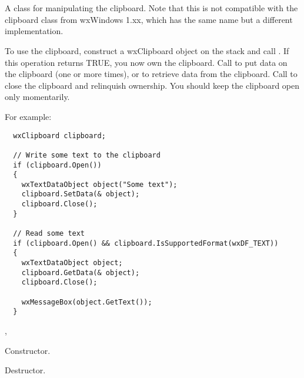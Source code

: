 \section{}\label{wxclipboard}

A class for manipulating the clipboard. Note that this is not compatible with the
clipboard class from wxWindows 1.xx, which has the same name but a different implementation.

To use the clipboard, construct a wxClipboard object on the stack and 
call . If this operation returns TRUE, you
now own the clipboard. Call  to put data
on the clipboard (one or more times), or  to
retrieve data from the clipboard. Call  to close
the clipboard and relinquish ownership. You should keep the clipboard open only momentarily.

For example:

\begin{verbatim}
  wxClipboard clipboard;

  // Write some text to the clipboard
  if (clipboard.Open())
  {
    wxTextDataObject object("Some text");
    clipboard.SetData(& object);
    clipboard.Close();
  }

  // Read some text
  if (clipboard.Open() && clipboard.IsSupportedFormat(wxDF_TEXT))
  {
    wxTextDataObject object;
    clipboard.GetData(& object);
    clipboard.Close();

    wxMessageBox(object.GetText());
  }
\end{verbatim}




, 




Constructor.



Destructor.

